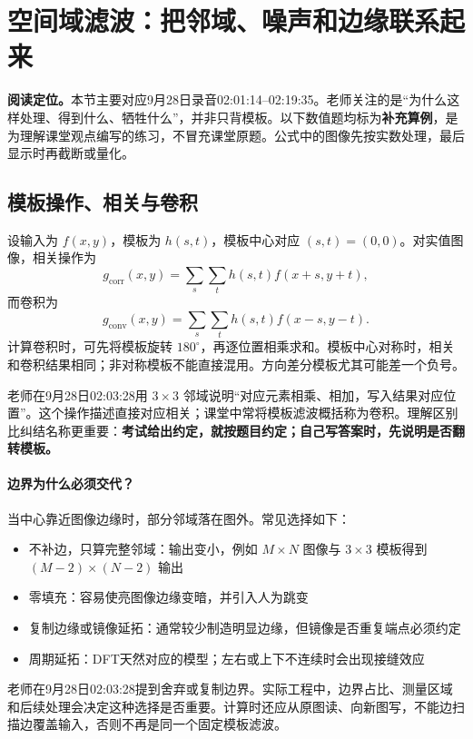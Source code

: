 \section{空间域滤波：把邻域、噪声和边缘联系起来}
\noindent\textbf{阅读定位。}本节主要对应9月28日录音02:01:14--02:19:35。老师关注的是“为什么这样处理、得到什么、牺牲什么”，并非只背模板。以下数值题均标为\textbf{补充算例}，是为理解课堂观点编写的练习，不冒充课堂原题。公式中的图像先按实数处理，最后显示时再截断或量化。

\subsection{模板操作、相关与卷积}
设输入为 $f(x,y)$，模板为 $h(s,t)$，模板中心对应 $(s,t)=(0,0)$。对实值图像，相关操作为
\[
g_{\mathrm{corr}}(x,y)=\sum_s\sum_t h(s,t)f(x+s,y+t),
\]
而卷积为
\[
g_{\mathrm{conv}}(x,y)=\sum_s\sum_t h(s,t)f(x-s,y-t).
\]
计算卷积时，可先将模板旋转 $180^\circ$，再逐位置相乘求和。模板中心对称时，相关和卷积结果相同；非对称模板不能直接混用。方向差分模板尤其可能差一个负号。

老师在9月28日02:03:28用 $3\times3$ 邻域说明“对应元素相乘、相加，写入结果对应位置”。这个操作描述直接对应相关；课堂中常将模板滤波概括称为卷积。理解区别比纠结名称更重要：\textbf{考试给出约定，就按题目约定；自己写答案时，先说明是否翻转模板。}

\paragraph{边界为什么必须交代？}
当中心靠近图像边缘时，部分邻域落在图外。常见选择如下：
\begin{itemize}
\item 不补边，只算完整邻域：输出变小，例如 $M\times N$ 图像与 $3\times3$ 模板得到 $(M-2)\times(N-2)$ 输出
\item 零填充：容易使亮图像边缘变暗，并引入人为跳变
\item 复制边缘或镜像延拓：通常较少制造明显边缘，但镜像是否重复端点必须约定
\item 周期延拓：DFT天然对应的模型；左右或上下不连续时会出现接缝效应
\end{itemize}
老师在9月28日02:03:28提到舍弃或复制边界。实际工程中，边界占比、测量区域和后续处理会决定这种选择是否重要。计算时还应从原图读、向新图写，不能边扫描边覆盖输入，否则不再是同一个固定模板滤波。

